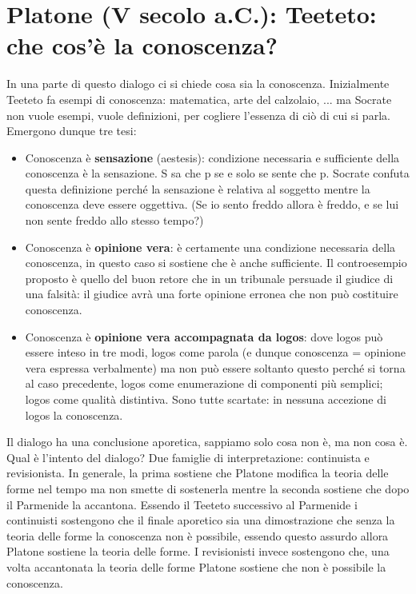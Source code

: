 \documentclass[10pt,a4paper]{article}
\begin{document}
\section{Platone (V secolo a.C.): Teeteto: che cos'è la conoscenza?}
In una parte di questo dialogo ci si chiede cosa sia la conoscenza. Inizialmente Teeteto fa esempi di conoscenza: matematica, arte del calzolaio, ... ma Socrate non vuole esempi, vuole definizioni, per cogliere l'essenza di ciò di cui si parla. Emergono dunque tre tesi:
\begin{itemize}
	\item Conoscenza è \textbf{sensazione} (aestesis): condizione necessaria e sufficiente della conoscenza è la sensazione. S sa che p se e solo se sente che p. Socrate confuta questa definizione perché la sensazione è relativa al soggetto mentre la conoscenza deve essere oggettiva. (Se io sento freddo allora è freddo, e se lui non sente freddo allo stesso tempo?)
	\item Conoscenza è \textbf{opinione vera}: è certamente una condizione necessaria della conoscenza, in questo caso si sostiene che è anche sufficiente. Il controesempio proposto è quello del buon retore che in un tribunale persuade il giudice di una falsità: il giudice avrà una forte opinione erronea che non può costituire conoscenza.
	\item Conoscenza è \textbf{opinione vera accompagnata da logos}: dove logos può essere inteso in tre modi, logos come parola (e dunque conoscenza = opinione vera espressa verbalmente) ma non può essere soltanto questo perché si torna al caso precedente, logos come enumerazione di componenti più semplici; logos come qualità distintiva. Sono tutte scartate: in nessuna accezione di logos la conoscenza. 
\end{itemize}
Il dialogo ha una conclusione aporetica, sappiamo solo cosa non è, ma non cosa è. Qual è l'intento del dialogo? Due famiglie di interpretazione: continuista e revisionista. In generale, la prima sostiene che Platone modifica la teoria delle forme nel tempo ma non smette di sostenerla mentre la seconda sostiene che dopo il Parmenide la accantona. Essendo il Teeteto successivo al Parmenide i continuisti sostengono che il finale aporetico sia una dimostrazione che senza la teoria delle forme la conoscenza non è possibile, essendo questo assurdo allora Platone sostiene la teoria delle forme. I revisionisti invece sostengono che, una volta accantonata la teoria delle forme Platone sostiene che non è possibile la conoscenza.
\end{document}
